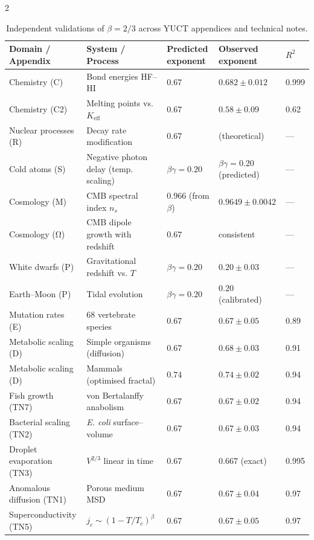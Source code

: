 \documentclass[11pt,a4paper]{article}
\newcommand{\betaf}{\beta}
\begin{document}
\begin{multicols}{2}
		\begin{table}[htbp]
			\centering
			\caption{Independent validations of \(\betaf = 2/3\) across YUCT appendices and technical notes.}
			\label{tab:full}
			\footnotesize
			\begin{tabular}{p{3.5cm}p{5.0cm}p{2.1cm}p{3.5cm}p{1.4cm}}
				\toprule
				\textbf{Domain / Appendix} & \textbf{System / Process} & \textbf{Predicted exponent} & \textbf{Observed exponent} & \(R^2\) \\
				\midrule
				Chemistry (C) & Bond energies HF–HI & \(0.67\) & \(0.682 \pm 0.012\) & 0.999 \\
				Chemistry (C2) & Melting points vs. \(K_{\mathrm{eff}}\) & \(0.67\) & \(0.58 \pm 0.09\) & 0.62 \\
				Nuclear processes (R) & Decay rate modification & \(0.67\) & (theoretical) & — \\
				Cold atoms (S) & Negative photon delay (temp. scaling) & \(\beta\gamma = 0.20\) & \(\beta\gamma = 0.20\) (predicted) & — \\
				Cosmology (M) & CMB spectral index \(n_s\) & \(0.966\) (from \(\beta\)) & \(0.9649 \pm 0.0042\) & — \\
				Cosmology (Ω) & CMB dipole growth with redshift & \(0.67\) & consistent & — \\
				White dwarfs (P) & Gravitational redshift vs. \(T\) & \(\beta\gamma = 0.20\) & \(0.20 \pm 0.03\) & — \\
				Earth–Moon (P) & Tidal evolution & \(\beta\gamma = 0.20\) & \(0.20\) (calibrated) & — \\
				Mutation rates (E) & 68 vertebrate species & \(0.67\) & \(0.67 \pm 0.05\) & 0.89 \\
				Metabolic scaling (D) & Simple organisms (diffusion) & \(0.67\) & \(0.68 \pm 0.03\) & 0.91 \\
				Metabolic scaling (D) & Mammals (optimised fractal) & \(0.74\) & \(0.74 \pm 0.02\) & 0.94 \\
				Fish growth (TN7) & von Bertalanffy anabolism & \(0.67\) & \(0.67 \pm 0.02\) & 0.94 \\
				Bacterial scaling (TN2) & \emph{E. coli} surface–volume & \(0.67\) & \(0.67 \pm 0.03\) & 0.94 \\
				Droplet evaporation (TN3) & \(V^{2/3}\) linear in time & \(0.67\) & \(0.667\) (exact) & 0.995 \\
				Anomalous diffusion (TN1) & Porous medium MSD & \(0.67\) & \(0.67 \pm 0.04\) & 0.97 \\
				Superconductivity (TN5) & \(j_c \sim (1-T/T_c)^{\beta}\) & \(0.67\) & \(0.67 \pm 0.05\) & 0.97 \\

\end{tabular}
\end{table}
\end{multicols}
\end{document}
